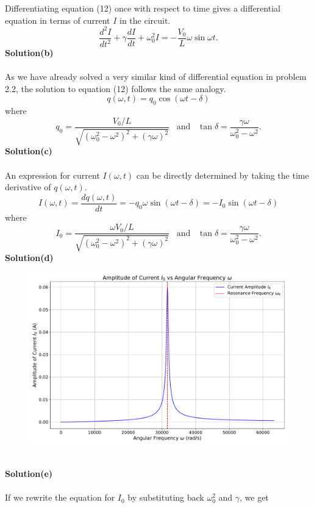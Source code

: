 \documentclass[12pt,a4paper]{article}
\begin{document}
Differentiating equation (12) once with respect to time gives a differential equation in terms of current $I$ in the circuit.
\begin{equation}
    \frac{d^2I}{dt^2}+\gamma\frac{dI}{dt}+\omega_0^2I=-\frac{V_0}{L}\omega\sin\omega t.
\end{equation}
\textbf{Solution(b)}
\\
\\As we have already solved a very similar kind of differential equation in problem 2.2, the solution to equation (12) follows the same analogy.
\[q(\omega,t)=q_0\cos(\omega t-\delta)\]
where
\[q_0=\frac{V_0/L}{\sqrt{\left(\omega_0^2-\omega^2\right)^2+(\gamma\omega)^2}}\,\,\,\,\,\text{and}\,\,\,\,\,\tan\delta=\frac{\gamma\omega}{\omega_0^2-\omega^2}.\]
\textbf{Solution(c)}
\\
\\An expression for current $I(\omega,t)$ can be directly determined by taking the time derivative of $q(\omega,t)$.
\[I(\omega,t)=\frac{dq(\omega,t)}{dt}=-q_0\omega\sin(\omega t-\delta)=-I_0\sin(\omega t-\delta)\]
where
\[I_0=\frac{\omega V_0/L}{\sqrt{\left(\omega_0^2-\omega^2\right)^2+(\gamma\omega)^2}}\,\,\,\,\,\text{and}\,\,\,\,\,\tan\delta=\frac{\gamma\omega}{\omega_0^2-\omega^2}.\]
\textbf{Solution(d)}
\begin{figure}[h]
    \centering
    \includegraphics[width=1\linewidth]{figs/fig_sol_2.5d.pdf}
\end{figure}
\\
\textbf{Solution(e)}
\\
\\If we rewrite the equation for $I_0$ by substituting back $\omega_0^2$ and $\gamma$, we get
\end{document}
